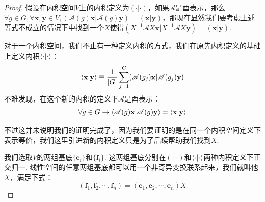 \begin{proof}
	假设在内积空间$V$上的内积定义为$(\cdot|\cdot)$，如果$\mathscr{A}$是酉表示，那么$\forall g\in G,\forall \mathbf{x},\mathbf{y}\in V,(\mathscr{A}(g)\mathbf{x}|\mathscr{A}(g)\mathbf{y})=(\mathbf{x}|\mathbf{y})$，那现在显然我们要考虑上述等式不成立的情况下中找到一个$X$使得$(X^{-1}\mathscr{A}X\mathbf{x}|X^{-1}\mathscr{A}X\mathbf{y})=(\mathbf{x}|\mathbf{y})$.
	
	对于一个内积空间，我们不止有一种定义内积的方式，我们在原先内积定义的基础上定义内积$\braket{\cdot|\cdot}$：
	\[\braket{\mathbf{x}|\mathbf{y}}\equiv\frac{1}{|G|}\sum\limits_{j=1}^{|G|}(\mathscr{A}(g_j)\mathbf{x}|\mathscr{A}(g_j)\mathbf{y})\]
	不难发现，在这个新的内积的定义下$\mathscr{A}$是酉表示：
	\[\forall g\in G\rightarrow\braket{\mathscr{A}(g)\mathbf{x}|\mathscr{A}(g)\mathbf{y}}=\braket{\mathbf{x}|\mathbf{y}}\]
	
	不过这并未说明我们的证明完成了，因为我们要证明的是在同一个内积空间定义下表示等价，我们这里引进新的内积定义只是为了后续帮助我们找到$X$.
	
	我们选取$V$的两组基底$\{\mathbf{e}_i\}$和$\{\mathbf{f}_i\}$. 这两组基底分别在$(\cdot|\cdot)$和$\braket{\cdot|\cdot}$两种内积定义下正交归一.
	线性空间的任意两组基底都可以用一个非奇异变换联系起来，我们就叫他$X$，满足下式：
	\[(\mathbf{f}_1,\mathbf{f}_2,\cdots,\mathbf{f}_n)=(\mathbf{e}_1,\mathbf{e}_2,\cdots,\mathbf{e}_n)X\]
	

\end{proof}
